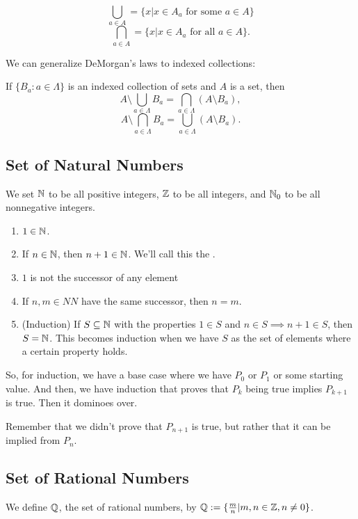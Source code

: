 \documentclass{book}
\begin{document}
\[\bigcup_{a \in A} = \{x | x \in A_a \textrm{ for some } a \in A\}\]
\[\bigcap_{a \in A} = \{x | x \in A_a \textrm{ for all } a \in A\}.\]

We can generalize DeMorgan's laws to indexed collections: 
\begin{thm}
    If $\{B_a : a \in \Lambda\}$ is an indexed collection of sets and $A$ is a set, then 
    \[A \setminus \bigcup_{a \in \Lambda} B_a = \bigcap_{a \in \Lambda} (A \setminus B_a),\]
    \[A \setminus \bigcap_{a \in \Lambda} B_a = \bigcup_{a \in \Lambda} (A \setminus B_a).\] 
\end{thm}

\subsection{Set of Natural Numbers}
We set $\mathbb{N}$ to be all positive integers, $\mathbb{Z}$ to be all integers, and $\mathbb{N}_0$ to be all nonnegative integers.

\begin{definition}
    \begin{enumerate}
        \item $1 \in \mathbb{N}$.
        \item If $n \in \mathbb{N}$, then $n + 1 \in \mathbb{N}$. We'll call this the .
        \item $1$ is not the successor of any element
        \item If $n, m \in NN$ have the same successor, then $n = m$. 
        \item (Induction) If $S \subseteq \mathbb{N}$ with the properties $1 \in S$ and $n \in S \implies n + 1 \in S$, then $S = \mathbb{N}$. This becomes induction when we have $S$ as the set of elements where a certain property holds.
    \end{enumerate}
\end{definition}

So, for induction, we have a base case where we have $P_0$ or $P_1$ or some starting value. And then, we have induction that proves that $P_k$ being true implies $P_{k + 1}$ is true. Then it dominoes over.

Remember that we didn't prove that $P_{n + 1}$ is true, but rather that it can be implied from $P_n$.

\subsection{Set of Rational Numbers}
We define $\mathbb{Q}$, the set of rational numbers, by $\mathbb{Q} := \{\frac{m}{n} | m, n \in \mathbb{Z}, n \neq 0\}$.
\end{document}
